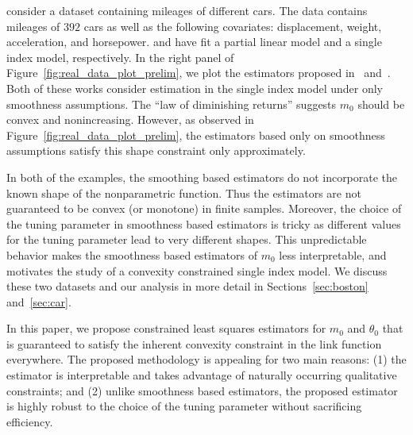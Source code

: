 \begin{example}\label{ex:car}
  \citet{cars_1983} consider a dataset containing mileages of different cars. The data contains mileages of $392$ cars as well as the following covariates:  displacement,   weight,  acceleration,   and horsepower.  \citet{MR2957294} and \cite{Patra16} have fit a partial linear model and a  single index model, respectively. In the right panel of Figure~\ref{fig:real_data_plot_prelim}, we plot the estimators  proposed in~\cite{Patra16} and~\cite{MR2529970}. Both of these works consider estimation in the single index model under only smoothness assumptions. The ``law of diminishing returns'' suggests $m_0$ should be convex and nonincreasing. However, as observed in Figure~\ref{fig:real_data_plot_prelim}, the estimators based only on smoothness assumptions satisfy this shape constraint only approximately. 


\end{example}
In both of the examples, the smoothing based estimators do not incorporate the known shape of the nonparametric function. Thus the estimators are not guaranteed to be convex (or monotone) in finite samples. Moreover, the choice of the tuning parameter in smoothness based estimators is tricky as different values for the tuning parameter lead to very different shapes. This unpredictable behavior makes the smoothness  based  estimators of $m_0$ less interpretable, and motivates the study of a convexity constrained single index model. {We discuss these two datasets and our analysis in more detail in Sections~\ref{sec:boston} and~\ref{sec:car}.}

In this paper, we propose constrained least squares estimators for $m_0$ and $\theta_0$ that is guaranteed to satisfy the inherent convexity constraint in the link function everywhere. The proposed methodology is appealing for two main reasons: (1) the estimator is interpretable and takes advantage of naturally occurring qualitative constraints; and (2) unlike smoothness based estimators, the proposed estimator is highly robust to the choice of the tuning parameter without sacrificing efficiency. 

